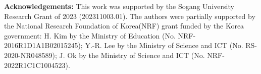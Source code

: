 \documentclass[reqno,centertags,11pt]{amsart}
\theoremstyle{definition}
\numberwithin{thm}{section}
\numberwithin{equation}{section}
\begin{document}
\textbf{Acknowledgements: }
This work was supported by the Sogang University Research Grant of 2023 (202311003.01).
The authors were partially supported by the National Research Foundation of Korea(NRF) grant funded by the Korea government: H. Kim  by the Ministry of Education (No. NRF-2016R1D1A1B02015245); Y.-R. Lee by   the Ministry of Science and ICT (No. RS-2020-NR048589); J. Ok by the Ministry of Science and ICT (No. NRF-2022R1C1C1004523).


\end{document}
